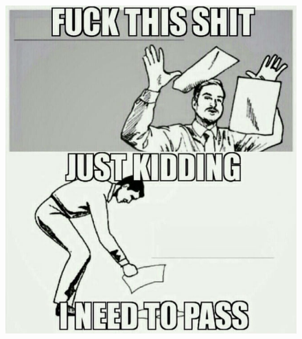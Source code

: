 \documentclass[]{book}
\theoremstyle{definition}
\theoremstyle{definition}
\theoremstyle{remark}
\begin{document}
\begin{figure}

{\centering \includegraphics[width=0.5\linewidth]{images/fuckexam} 

}

\end{figure}
\end{document}
